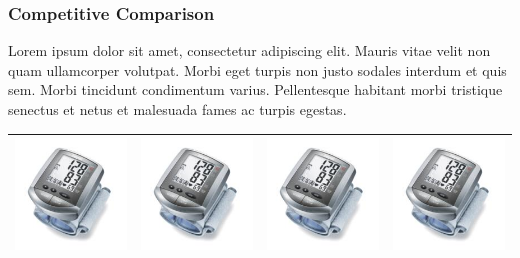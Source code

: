 \documentclass[11pt,titlepage]{article}
\begin{document}
\subsubsection{Competitive Comparison}
Lorem ipsum dolor sit amet, consectetur adipiscing elit. Mauris vitae velit 
non quam ullamcorper volutpat. Morbi eget turpis non justo sodales interdum 
et quis sem. Morbi tincidunt condimentum varius. Pellentesque habitant morbi 
tristique senectus et netus et malesuada fames ac turpis egestas.\newline
\begin{tabular}{| m{92 pt} | m{92 pt} | m{92 pt} | m{92 pt} |}\hline
  \includegraphics[scale=0.30,bb=0 0 150 150]{prod_bpm1.jpg} & 
  \includegraphics[scale=0.30,bb=0 0 150 150]{prod_bpm2.jpg} & 
  \includegraphics[scale=0.25,bb=0 0 150 150]{prod_bpm3.jpg} & 
  \includegraphics[scale=0.20,bb=0 0 150 150]{prod_bpm4.jpg}\\\hline

\end{tabular}
\end{document}
